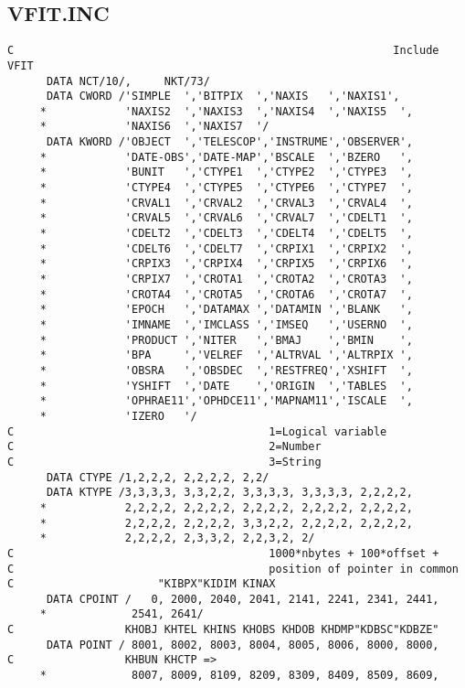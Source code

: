 \subsection{VFIT.INC}
\begin{verbatim}
C                                                          Include VFIT
      DATA NCT/10/,     NKT/73/
      DATA CWORD /'SIMPLE  ','BITPIX  ','NAXIS   ','NAXIS1',
     *            'NAXIS2  ','NAXIS3  ','NAXIS4  ','NAXIS5  ',
     *            'NAXIS6  ','NAXIS7  '/
      DATA KWORD /'OBJECT  ','TELESCOP','INSTRUME','OBSERVER',
     *            'DATE-OBS','DATE-MAP','BSCALE  ','BZERO   ',
     *            'BUNIT   ','CTYPE1  ','CTYPE2  ','CTYPE3  ',
     *            'CTYPE4  ','CTYPE5  ','CTYPE6  ','CTYPE7  ',
     *            'CRVAL1  ','CRVAL2  ','CRVAL3  ','CRVAL4  ',
     *            'CRVAL5  ','CRVAL6  ','CRVAL7  ','CDELT1  ',
     *            'CDELT2  ','CDELT3  ','CDELT4  ','CDELT5  ',
     *            'CDELT6  ','CDELT7  ','CRPIX1  ','CRPIX2  ',
     *            'CRPIX3  ','CRPIX4  ','CRPIX5  ','CRPIX6  ',
     *            'CRPIX7  ','CROTA1  ','CROTA2  ','CROTA3  ',
     *            'CROTA4  ','CROTA5  ','CROTA6  ','CROTA7  ',
     *            'EPOCH   ','DATAMAX ','DATAMIN ','BLANK   ',
     *            'IMNAME  ','IMCLASS ','IMSEQ   ','USERNO  ',
     *            'PRODUCT ','NITER   ','BMAJ    ','BMIN    ',
     *            'BPA     ','VELREF  ','ALTRVAL ','ALTRPIX ',
     *            'OBSRA   ','OBSDEC  ','RESTFREQ','XSHIFT  ',
     *            'YSHIFT  ','DATE    ','ORIGIN  ','TABLES  ',
     *            'OPHRAE11','OPHDCE11','MAPNAM11','ISCALE  ',
     *            'IZERO   '/
C                                       1=Logical variable
C                                       2=Number
C                                       3=String
      DATA CTYPE /1,2,2,2, 2,2,2,2, 2,2/
      DATA KTYPE /3,3,3,3, 3,3,2,2, 3,3,3,3, 3,3,3,3, 2,2,2,2,
     *            2,2,2,2, 2,2,2,2, 2,2,2,2, 2,2,2,2, 2,2,2,2,
     *            2,2,2,2, 2,2,2,2, 3,3,2,2, 2,2,2,2, 2,2,2,2,
     *            2,2,2,2, 2,3,3,2, 2,2,3,2, 2/
C                                       1000*nbytes + 100*offset +
C                                       position of pointer in common
C                      "KIBPX"KIDIM KINAX
      DATA CPOINT /   0, 2000, 2040, 2041, 2141, 2241, 2341, 2441,
     *             2541, 2641/
C                 KHOBJ KHTEL KHINS KHOBS KHDOB KHDMP"KDBSC"KDBZE"
      DATA POINT / 8001, 8002, 8003, 8004, 8005, 8006, 8000, 8000,
C                 KHBUN KHCTP =>
     *             8007, 8009, 8109, 8209, 8309, 8409, 8509, 8609,

\end{verbatim}

